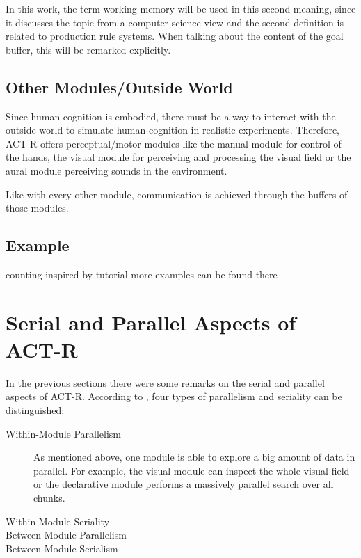 In this work, the term working memory will be used in this second meaning, since it discusses the topic from a computer science view and the second definition is related to production rule systems. When talking about the content of the goal buffer, this will be remarked explicitly.

\subsection{Other Modules/Outside World}

Since human cognition is embodied, there must be a way to interact with the outside world to simulate human cognition in realistic experiments. Therefore, ACT-R offers perceptual/motor modules like the manual module for control of the hands, the visual module for perceiving and processing the visual field or the aural module perceiving sounds in the environment.

Like with every other module, communication is achieved through the buffers of those modules. 

\subsection{Example}

counting
inspired by tutorial
more examples can be found there

\section{Serial and Parallel Aspects of ACT-R}

In the previous sections there were some remarks on the serial and parallel aspects of ACT-R. According to \cite[p. 68]{anderson_how_2007}, four types of parallelism and seriality can be distinguished:

\begin{description}
 \item[Within-Module Parallelism] As mentioned above, one module is able to explore a big amount of data in parallel. For example, the visual module can inspect the whole visual field or the declarative module performs a massively parallel search over all chunks.
 \item[Within-Module Seriality] 
 \item[Between-Module Parallelism]
 \item[Between-Module Serialism]
\end{description}

